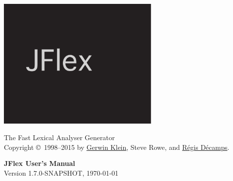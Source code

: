 \documentclass[11pt]{scrartcl}
\begin{document}
\centerline{\includegraphics[width=0.6\textwidth]{fig/jflex-black}}

\begin{center}
\sffamily
{\Large The Fast Lexical Analyser Generator}\\
\smallskip\smallskip
Copyright \copyright\ 1998--2015 by \href{http://www.doclsf.de}{Gerwin Klein},
Steve Rowe, and \href{http://regis.decamps.info/}{R\'egis D\'ecamps}.

\vspace*{15ex}
{\Huge \sffamily \bfseries JFlex User's Manual}\\
\bigskip
Version 1.7.0-SNAPSHOT, {\today}
\end{center}

\newpage
\tableofcontents
\newpage











\newpage  



\end{document}
